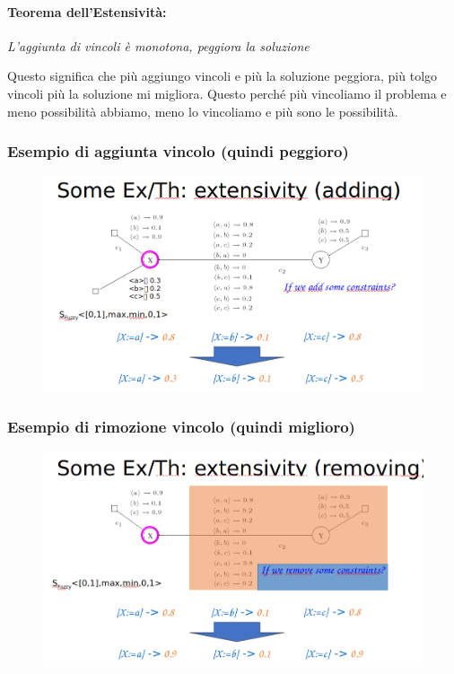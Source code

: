 \paragraph{Teorema dell'Estensività: }
\begin{center}
    \textit{L'aggiunta di vincoli è monotona, peggiora la soluzione}
\end{center}
Questo significa che più aggiungo vincoli e più la soluzione peggiora, più tolgo
vincoli più la soluzione mi migliora. Questo perché più vincoliamo il problema e
meno possibilità abbiamo, meno lo vincoliamo e più sono le possibilità.

\subsubsection{Esempio di aggiunta vincolo (quindi peggioro)}

\begin{figure}[H]
    \centering
    \includegraphics[width=12.5cm, keepaspectratio]{img/Cap4/worst2.png}
\end{figure}

\subsubsection{Esempio di rimozione vincolo (quindi miglioro)}
\begin{figure}[H]
    \centering
    \includegraphics[width=12.5cm, keepaspectratio]{img/Cap4/better2.png}
\end{figure}


